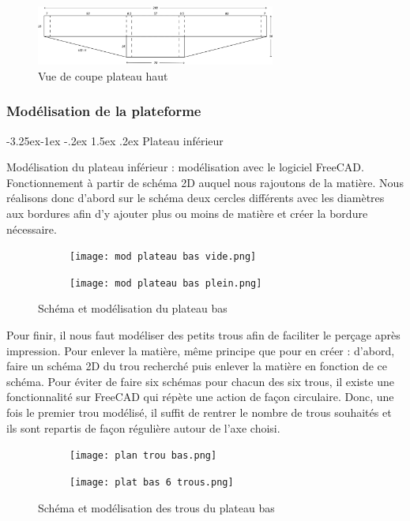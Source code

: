 \documentclass[a4paper,12pt]{article}
\makeatletter
\newcounter{subsubsubsection}[subsubsection]
\newcommand\subsubsubsection{\@startsection{subsubsubsection}{4}{\z@}%
                                     {-3.25ex\@plus -1ex \@minus -.2ex}%
                                     {1.5ex \@plus .2ex}%
                                     {\normalfont\small\bfseries}}
\makeatother
\begin{document}
\begin{figure}[H]
  \centering
  \includegraphics[width=0.7\textwidth]{vue de coupe plateau haut.jpg}
  \caption{Vue de coupe plateau haut}
\end{figure}

\subsubsection{Modélisation de la plateforme}

\subsubsubsection{Plateau inférieur}

Modélisation du plateau inférieur :
modélisation avec le logiciel FreeCAD. Fonctionnement à partir de schéma 2D auquel nous rajoutons de la matière. Nous réalisons donc d’abord sur le schéma deux cercles différents avec les diamètres  aux bordures afin d’y ajouter plus ou moins de matière et créer la bordure nécessaire.

\begin{figure}[H]
    \centering
    \begin{subfigure}[]{0.4\textwidth}
        \texttt{[image: mod plateau bas vide.png]}
    \end{subfigure}
    \begin{subfigure}[]{0.4\textwidth}
        \texttt{[image: mod plateau bas plein.png]}
    \end{subfigure}
    \caption{Schéma et modélisation du plateau bas}
\end{figure}

Pour finir, il nous faut modéliser des petits trous afin de faciliter le perçage après impression.
Pour enlever la matière, même principe que pour en créer : d’abord, faire un schéma 2D du trou recherché puis enlever la matière en fonction de ce schéma. 
Pour éviter de faire six schémas pour chacun des six trous, il existe une fonctionnalité sur FreeCAD qui répète une action de façon circulaire. Donc, une fois le premier trou modélisé, il suffit de rentrer le nombre de trous souhaités et ils sont repartis de façon régulière autour de l’axe choisi.

\begin{figure}[H]
    \centering
    \begin{subfigure}[]{0.4\textwidth}
        \texttt{[image: plan trou bas.png]}
    \end{subfigure}
    \begin{subfigure}[]{0.4\textwidth}
        \texttt{[image: plat bas 6 trous.png]}
    \end{subfigure}
    \caption{Schéma et modélisation des trous du plateau bas}
\end{figure}
\end{document}
